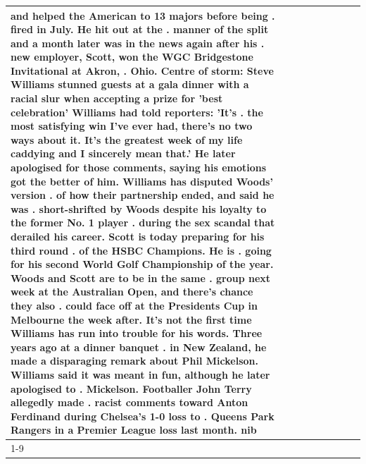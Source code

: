 \begin{table}[H]
\begin{tabular}{lllrlllll}
and helped the American to 13 majors before being . fired in July. He hit out at the . manner of the split and a month later was in the news again after his . new employer, Scott, won the WGC Bridgestone Invitational at Akron, . Ohio. Centre of storm: Steve Williams stunned guests at a gala dinner with a racial slur when accepting a prize for 'best celebration' Williams had told reporters: 'It's . the most satisfying win I've ever had, there's no two ways about it. It's the greatest week of my life caddying and I sincerely mean that.' He later apologised for those comments, saying his emotions got the better of him. Williams has disputed Woods' version . of how their partnership ended, and said he was . short-shrifted by Woods despite his loyalty to the former No. 1 player . during the sex scandal that derailed his career. Scott is today preparing for his third round . of the HSBC Champions. He is . going for his second World Golf Championship of the year. Woods and Scott are to be in the same . group next week at the Australian Open, and there's chance they also . could face off at the Presidents Cup in Melbourne the week after. It's not the first time Williams has run into trouble for his words. Three years ago at a dinner banquet . in New Zealand, he made a disparaging remark about Phil Mickelson. Williams said it was meant in fun, although he later apologised to . Mickelson. Footballer John Terry allegedly made . racist comments toward Anton Ferdinand during Chelsea's 1-0 loss to . Queens Park Rangers in a Premier League loss last month. nib \\
\cline{1-9}

\end{tabular}
\end{table}
